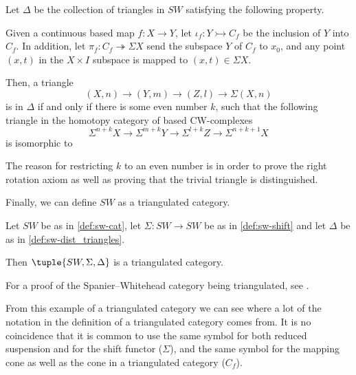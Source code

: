 \begin{definition}
    \label{def:sw-dist_triangles}
    Let \( \Delta \) be the collection of triangles in \( SW \) satisfying the following property.

    Given a continuous based map \( f: X \to Y \), let \( \iota_f: Y \rightarrowtail C_f \) be the inclusion of \( Y \) into \( C_f \). In addition, let \( \pi_f: C_f \twoheadrightarrow \Sigma X \) send the subspace \( Y \) of \( C_f \) to \( x_0 \), and any point \( (x, t) \) in the \( X \times I \) subspace is mapped to \( (x, t) \in \Sigma X \).
    
    Then, a triangle
    \[
        (X, n) \to (Y, m) \to (Z, l) \to \Sigma (X, n)
    \]
    is in \( \Delta \) if and only if there is some even number \( k \), such that the following triangle in the homotopy category of based CW-complexes
    \[
        \Sigma^{n + k} X \to \Sigma^{m + k} Y \to \Sigma^{l + k} Z \to \Sigma^{n + k + 1} X
    \]
    is isomorphic to
    \begin{center}
    \end{center}
\end{definition}

The reason for restricting \( k \) to an even number is in order to prove the right rotation axiom as well as proving that the trivial triangle is distinguished.

Finally, we can define \( SW \) as a triangulated category.

\begin{example}
    Let \( SW \) be as in \autoref{def:sw-cat}, let \( \Sigma: SW \to SW \) be as in \autoref{def:sw-shift} and let \( \Delta \) be as in \autoref{def:sw-dist_triangles}.

    Then \( \tuple{SW, \Sigma, \Delta} \) is a triangulated category.
\end{example}

For a proof of the Spanier--Whitehead category being triangulated, see \cite[Theorem 5.9]{Daria_Bachelor}.

From this example of a triangulated category we can see where a lot of the notation in the definition of a triangulated category comes from. It is no coincidence that it is common to use the same symbol for both reduced suspension and for the shift functor (\( \Sigma \)), and the same symbol for the mapping cone as well as the cone in a triangulated category (\( C_f \)).
